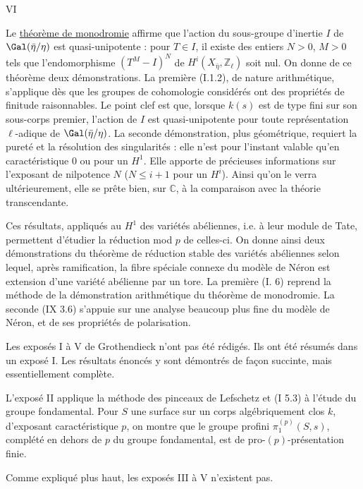\clearpage
\thispagestyle{empty}
\begin{center}
VI
\end{center}

Le \underline{théorème de monodromie} affirme que l'action du sous-groupe d'inertie $I$
de $\Gal(\bar\eta/\eta)$ est quasi-unipotente : pour $T\in I$, il existe des entiers $N>0$,
$M>0$ tels que l'endomorphisme $(T^M-I)^N$ de $H^i(X_{\bar\eta},\mathbb Z_\ell)$ soit nul. On donne de ce
théorème deux démonstrations. La première (I.1.2), de nature arithmétique, s'applique
dès que les groupes de cohomologie considérés ont des propriétés de finitude raisonnables.
Le point clef est que, lorsque $k(s)$ est de type fini sur son sous-corps
premier, l'action de $I$ est quasi-unipotente pour toute représentation $\ell$-adique de
$\Gal(\bar\eta/\eta)$. La seconde démonstration, plus géométrique, requiert la pureté et la résolution
des singularités : elle n'est pour l'instant valable qu'en caractéristique $0$
ou pour un $H^1$. Elle apporte de précieuses informations sur l'exposant de nilpotence
$N$ ($N\leq i+1$ pour un $H^i$). Ainsi qu'on le verra ultérieurement, elle se prête bien,
sur $\mathbb C$, à la comparaison avec la théorie transcendante.

Ces résultats, appliqués au $H^1$ des variétés abéliennes, i.e. à leur module
de Tate, permettent d'étudier la réduction mod $p$ de celles-ci. On donne ainsi deux
démonstrations du théorème de réduction stable des variétés abéliennes selon lequel,
après ramification, la fibre spéciale connexe du modèle de Néron est extension d'une
variété abélienne par un tore. La première (I. 6) reprend la méthode de la démonstration
arithmétique du théorème de monodromie. La seconde (IX 3.6) s'appuie sur une
analyse beaucoup plus fine du modèle de Néron, et de ses propriétés de polarisation.

Les exposés I à V de Grothendieck n'ont pas été rédigés. Ils ont été résumés
dans un exposé I. Les résultats énoncés y sont démontrés de façon succinte, mais
essentiellement complète.

L'exposé II applique la méthode des pinceaux de Lefschetz et (I 5.3) à
l'étude du groupe fondamental. Pour $S$ une surface sur un corps algébriquement clos
$k$, d'exposant caractéristique $p$, on montre que le groupe profini $\pi_1^{(p)}(S,s)$, complété
en dehors de $p$ du groupe fondamental, est de pro-$(p)$-présentation finie.

Comme expliqué plus haut, les exposés III à V n'existent pas.

